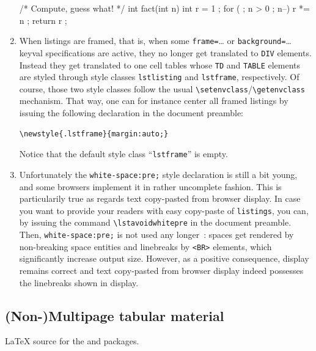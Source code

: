 \begin{enumerate}
\begingroup%
%
{\lstset{language=C, style=colors}}
{}
\begin{clisting}
/* Compute, guess what! */
int fact(int n) {
  int r = 1 ;
  for ( ; n > 0 ; n--) {
    r *= n ;
  }
  return r ;
}
\end{clisting}
\endgroup\fi
\item When listings are framed, that is, when  some
\texttt{frame=}\ldots{} or \texttt{background=}\ldots{} keyval
specifications are active, they no longer get translated to \verb+DIV+
elements.
Instead they get translated to one cell tables whose \verb+TD+
and \verb+TABLE+ elements
are styled through style classes \texttt{lstlisting} and
\texttt{lstframe}, respectively. Of course, those two style classes
follow the usual \verb+\setenvclass+/\verb+\getenvclass+ mechanism.
That way, one can for instance center all framed listings by issuing
the following declaration in the document preamble:
\begin{verbatim}
\newstyle{.lstframe}{margin:auto;}
\end{verbatim}
Notice that the default style class ``\texttt{lstframe}'' is empty.

\item {}%
Unfortunately the \verb+white-space:pre;+ style declaration is still a
bit young, and some browsers implement it in rather uncomplete
fashion.  This is particularily true as regards text copy-pasted from
browser display.  In case you want to provide your readers with easy
copy-paste of \texttt{listings}, you can, by issuing the command
\verb+\lstavoidwhitepre+ in the document preamble.  Then,
\verb+white-space:pre;+ is not used any longer~: spaces get rendered
by non-breaking space entities and linebreaks by \verb+<BR>+ elements,
which significantly increase output size.  However, as a positive
consequence, display remains correct and text copy-pasted from browser
display indeed possesses the linebreaks shown in display.
\end{enumerate}


\subsection{(Non-)Multipage tabular material}
\LaTeX{} source
for the
and 
packages.

